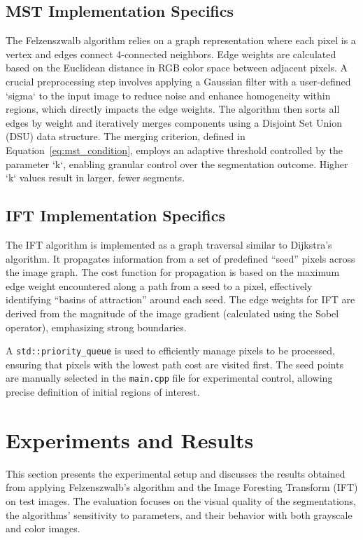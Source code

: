 \documentclass{sbc2023}
\begin{document}
\subsection{MST Implementation Specifics}
The Felzenszwalb algorithm relies on a graph representation where each pixel is a vertex and edges connect 4-connected neighbors. Edge weights are calculated based on the Euclidean distance in RGB color space between adjacent pixels. A crucial preprocessing step involves applying a Gaussian filter with a user-defined `sigma` to the input image to reduce noise and enhance homogeneity within regions, which directly impacts the edge weights. The algorithm then sorts all edges by weight and iteratively merges components using a Disjoint Set Union (DSU) data structure. The merging criterion, defined in Equation~\ref{eq:mst_condition}, employs an adaptive threshold controlled by the parameter `k`, enabling granular control over the segmentation outcome. Higher `k` values result in larger, fewer segments.

\subsection{IFT Implementation Specifics}

The IFT algorithm is implemented as a graph traversal similar to Dijkstra's algorithm. It propagates information from a set of predefined ``seed'' pixels across the image graph. The cost function for propagation is based on the maximum edge weight encountered along a path from a seed to a pixel, effectively identifying ``basins of attraction'' around each seed. The edge weights for IFT are derived from the magnitude of the image gradient (calculated using the Sobel operator), emphasizing strong boundaries.

A \texttt{std::priority\_queue} is used to efficiently manage pixels to be processed, ensuring that pixels with the lowest path cost are visited first. The seed points are manually selected in the \texttt{main.cpp} file for experimental control, allowing precise definition of initial regions of interest.

\section{Experiments and Results}
\label{sec:experiments}

This section presents the experimental setup and discusses the results obtained from applying Felzenszwalb's algorithm and the Image Foresting Transform (IFT) on test images. The evaluation focuses on the visual quality of the segmentations, the algorithms' sensitivity to parameters, and their behavior with both grayscale and color images.
\end{document}

